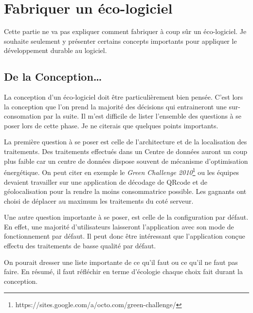 \documentclass[a4paper, 11pt]{report}
\begin{document}

		
	\section{Fabriquer un éco-logiciel}
Cette partie ne va pas expliquer comment fabriquer à coup sûr un éco-logiciel. Je souhaite seulement y présenter certains concepts importants pour appliquer le développement durable au logiciel.
		\subsection{De la Conception\ldots}
La conception d'un éco-logiciel doit être particulièrement bien pensée. C'est lors la conception que l'on prend la majorité des décisions qui entraineront une sur-consomation par la suite. Il m'est difficile de lister l'ensemble des questions à se poser lors de cette phase. Je ne citerais que quelques points importants.

La première question à se poser est celle de l'architecture et de la localisation des traitements\cite{EcoLogiciels}. Des traitements effectués dans un Centre de données auront un coup plus faible car un centre de données dispose souvent de mécanisme d'optimisation énergétique. On peut citer en exemple le \textit{Green Challenge 2010}\footnote{https://sites.google.com/a/octo.com/green-challenge/} ou les équipes devaient travailler sur une application de décodage de QRcode et de géolocalisation pour la rendre la moins consommatrice possible. Les gagnants ont choisi de déplacer au maximum les traitements du coté serveur. 

Une autre question importante à se poser, est celle de la configuration par défaut\cite{GreenPattern}. En effet, une majorité d'utilisateurs laisseront l'application avec son mode de fonctionnement par défaut. Il peut donc être intéressant que l'application conçue effectu des traitements de basse qualité par défaut.

On pourait dresser une liste importante de ce qu'il faut ou ce qu'il ne faut pas faire. En résumé, il faut réfléchir en terme d'écologie chaque choix  fait durant la conception.
\end{document}
